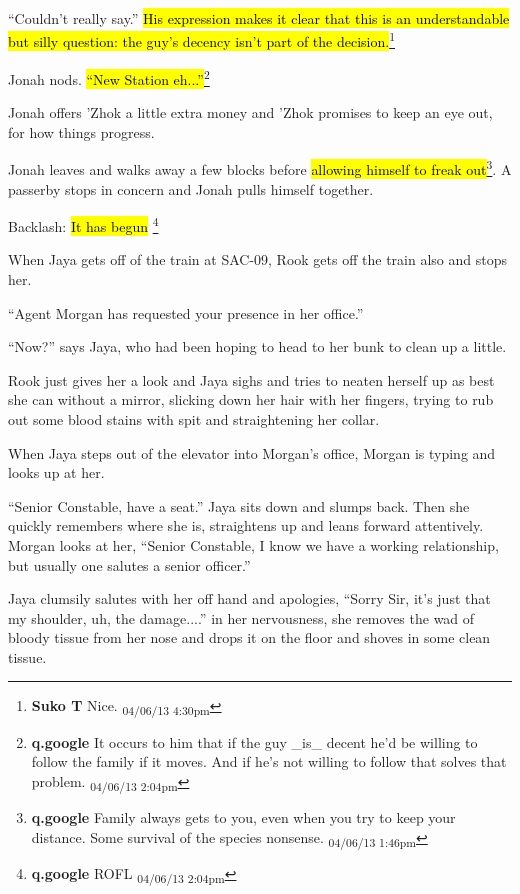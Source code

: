 ``Couldn't really say.''  \hl{His expression makes it clear that this is an understandable but silly question: the guy's decency isn't part of the decision.}\footnote{\textbf{Suko T }Nice. \textsubscript{04/06/13 4:30pm}}

Jonah nods.  \hl{``New Station eh...''}\footnote{\textbf{q.google }It occurs to him that if the guy \_is\_ decent he'd be willing to follow the family if it moves.  And if he's not willing to follow that solves that problem. \textsubscript{04/06/13 2:04pm}}

Jonah offers 'Zhok a little extra money and 'Zhok promises to keep an eye out, for how things progress.



Jonah leaves and walks away a few blocks before \hl{allowing himself to freak out}\footnote{\textbf{q.google }Family always gets to you, even when you try to keep your distance.  Some survival of the species nonsense. \textsubscript{04/06/13 1:46pm}}.  A passerby stops in concern and Jonah pulls himself together.





 {\LARGE Backlash:  }  {\LARGE \hl{It has begun} } \footnote{\textbf{q.google }ROFL \textsubscript{04/06/13 2:04pm}}



When Jaya gets off of the train at SAC-09, Rook gets off the train also and stops her.

``Agent Morgan has requested your presence in her office.''

``Now?'' says Jaya, who had been hoping to head to her bunk to clean up a little.

Rook just gives her a look and Jaya sighs and tries to neaten herself up as best she can without  a mirror, slicking down her hair with her fingers, trying to rub out some blood stains with spit and straightening her collar.



When Jaya steps out of the elevator into Morgan's office, Morgan is typing and looks up at her.

``Senior Constable, have a seat.''  Jaya sits down and slumps back.  Then she quickly remembers where she is, straightens up and leans forward attentively. Morgan looks at her, ``Senior Constable, I know we have a working relationship, but usually one salutes a senior officer.''

Jaya clumsily salutes with her off hand and apologies, ``Sorry Sir, it's just that my shoulder, uh, the damage....'' in her nervousness, she removes the wad of bloody tissue from her nose and drops it on the floor and shoves in some clean tissue.

